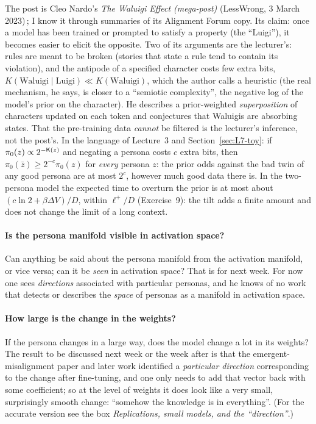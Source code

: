 \begin{beyond}\label{box:L7-waluigi}
The post is Cleo Nardo's \emph{The Waluigi Effect (mega-post)} (LessWrong, 3 March 2023)\,\citep{nardo2023}; I know it through summaries of its Alignment Forum copy. Its claim: once a model has been trained or prompted to satisfy a property (the ``Luigi''), it becomes easier to elicit the opposite. Two of its arguments are the lecturer's: rules are meant to be broken (stories that state a rule tend to contain its violation), and the antipode of a specified character costs few extra bits, $K(\text{Waluigi}\mid\text{Luigi})\ll K(\text{Waluigi})$, which the author calls a heuristic (the real mechanism, he says, is closer to a ``semiotic complexity'', the negative log of the model's prior on the character). He describes a prior-weighted \emph{superposition} of characters updated on each token and conjectures that Waluigis are absorbing states. That the pre-training data \emph{cannot} be filtered is the lecturer's inference, not the post's.
In the language of Lecture~3 and Section~\ref{sec:L7-toy}: if $\pi_0(z)\propto2^{-\mathsf{K}(z)}$ and negating a persona costs $c$ extra bits, then $\pi_0(\bar z)\ge2^{-c}\pi_0(z)$ for \emph{every} persona $z$: the prior odds against the bad twin of any good persona are at most $2^{c}$, however much good data there is. In the two-persona model the expected time to overturn the prior is at most about $(c\ln2+\beta\Delta V)/D$, within $\ell^+/D$ (Exercise~9): the tilt adds a finite amount and does not change the limit of a long context.
\end{beyond}

\paragraph{Is the persona manifold visible in activation space?}
Can anything be said about the persona manifold from the activation manifold, or vice versa; can it be \emph{seen} in activation space? That is for next week. For now one sees \emph{directions} associated with particular personas, and he knows of no work that detects or describes the \emph{space} of personas as a manifold in activation space.

\paragraph{How large is the change in the weights?}
If the persona changes in a large way, does the model change a lot in its weights? The result to be discussed next week or the week after is that the emergent-misalignment paper and later work identified a \emph{particular direction} corresponding to the change after fine-tuning, and one only needs to add that vector back with some coefficient; so at the level of weights it does look like a very small, surprisingly smooth change: ``somehow the knowledge is in everything''. (For the accurate version see the box \emph{Replications, small models, and the ``direction''}.)

